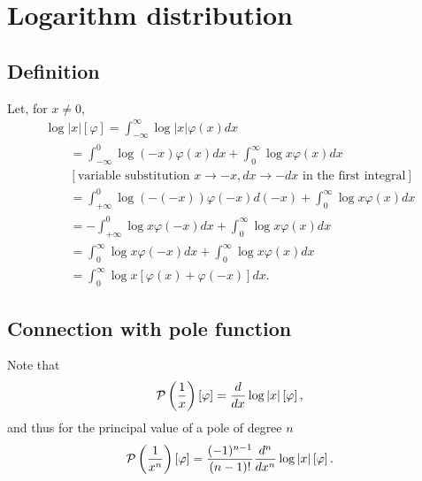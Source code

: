 \section{Logarithm distribution}

\subsection{Definition}
Let, for $x\neq 0$,
\begin{equation}
\begin{split}
\log \left|x\right| \left[ \varphi \right]
=
\int_{-\infty}^\infty  \log \left|x\right|  \varphi(x) dx
\\
\qquad
=
\int_{-\infty}^0 \log (-x)   \varphi(x) dx
+
\int_{0}^\infty   \log x    \varphi(x) dx
\\
\qquad
[\textrm{variable substitution }x\rightarrow -x, dx \rightarrow -dx \textrm{ in the first integral}]
\\
\qquad
=
\int_{+\infty}^0  \log  (-(-x))     \varphi(-x) d(-x)
+
\int_{0}^\infty   \log x    \varphi(x) dx
\\
\qquad
=
-\int_{+\infty}^0  \log x    \varphi(-x) d x
+
\int_{0}^\infty   \log x    \varphi(x) dx
\\
\qquad
=
\int_0^{\infty}  \log x    \varphi(-x) d x
+
\int_{0}^\infty   \log x    \varphi(x) dx
\\
\qquad
=
\int_0^{\infty}  \log x  \left[  \varphi(x)
+
   \varphi(-x) \right] dx
 .
\end{split}
\label{2012-m-ch-di-logdidef}
\end{equation}

\subsection{Connection with pole function}
Note that
\begin{equation}
 {\cal P} \left(\frac{1}{x}\right) \left[\varphi\right]  = \frac{d}{dx} \log \vert x \vert \left[\varphi\right]
,
\end{equation}
and thus
for the principal value of a pole of degree $n$
\begin{equation}
  {\cal P} \left(\frac{1}{x^n}\right) \left[\varphi\right]  =  \frac{(-1)^{n-1}}{(n-1)!}
\frac{d^n}{dx^n} \log \vert x \vert \left[\varphi\right]
.
\end{equation}



